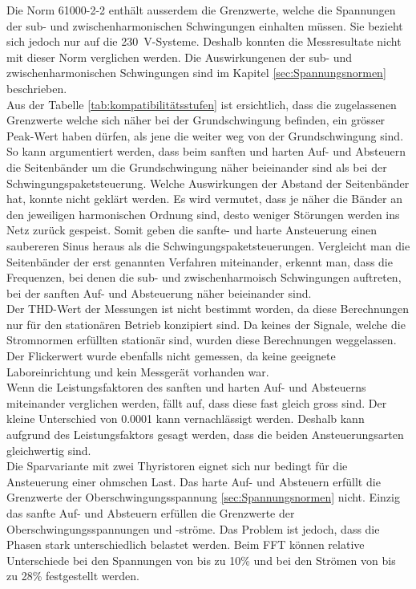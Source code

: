 Die Norm 61000-2-2 enthält ausserdem die Grenzwerte, welche die Spannungen der sub- und zwischenharmonischen Schwingungen einhalten müssen. Sie bezieht sich jedoch nur auf die \SI{230}{V}-Systeme. Deshalb konnten die Messresultate nicht mit dieser Norm verglichen werden. Die Auswirkungenen der sub- und zwischenharmonischen Schwingungen sind im Kapitel \ref{sec:Spannungsnormen} beschrieben.\\ Aus der Tabelle \ref{tab:kompatibilitätsstufen} ist ersichtlich, dass die zugelassenen Grenzwerte welche sich näher bei der Grundschwingung befinden, ein grösser Peak-Wert haben dürfen, als jene die weiter weg von der Grundschwingung sind. So kann argumentiert werden, dass beim sanften und harten Auf- und Absteuern die Seitenbänder um die Grundschwingung näher beieinander sind als bei der Schwingungspaketsteuerung. Welche Auswirkungen der Abstand der Seitenbänder hat, konnte nicht geklärt werden. Es wird vermutet, dass je näher die Bänder an den jeweiligen harmonischen Ordnung sind, desto weniger Störungen werden ins Netz zurück gespeist. Somit geben die sanfte- und harte Ansteuerung einen saubereren Sinus heraus als die Schwingungspaketsteuerungen. Vergleicht man die Seitenbänder der erst genannten Verfahren miteinander, erkennt man, dass die Frequenzen, bei denen die sub- und zwischenharmoisch Schwingungen auftreten, bei der sanften Auf- und Absteuerung näher beieinander sind.\\

Der THD-Wert der Messungen ist nicht bestimmt worden, da diese Berechnungen nur für den stationären Betrieb konzipiert sind. Da keines der Signale, welche die Stromnormen erfüllten stationär sind, wurden diese Berechnungen weggelassen. Der Flickerwert wurde ebenfalls nicht gemessen, da keine geeignete Laboreinrichtung und kein Messgerät vorhanden war.\\

Wenn die Leistungsfaktoren des sanften und harten Auf- und Absteuerns miteinander verglichen werden, fällt auf, dass diese fast gleich gross sind. Der kleine Unterschied von 0.0001 kann vernachlässigt werden. Deshalb kann aufgrund des Leistungsfaktors gesagt werden, dass die beiden Ansteuerungsarten gleichwertig sind.\\

Die Sparvariante mit zwei Thyristoren eignet sich nur bedingt für die Ansteuerung einer ohmschen Last. Das harte Auf- und Absteuern erfüllt die Grenzwerte der Oberschwingungsspannung \ref{sec:Spannungsnormen} nicht. Einzig das sanfte Auf- und Absteuern erfüllen die Grenzwerte der Oberschwingungsspannungen und -ströme. Das Problem ist jedoch, dass die Phasen stark unterschiedlich belastet werden. Beim FFT können relative Unterschiede bei den Spannungen von bis zu 10\% und bei den Strömen von bis zu 28\% festgestellt werden.\\

